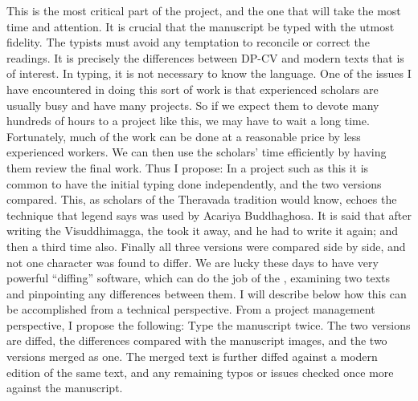\markdownRendererBlockQuoteEnd \markdownRendererInterblockSeparator
{}\markdownRendererInterblockSeparator
{}This is the most critical part of the project, and the one that will take the most time and attention. It is crucial that the manuscript be typed with the utmost fidelity. The typists must avoid any temptation to reconcile or correct the readings. It is precisely the differences between DP-CV and modern texts that is of interest.\markdownRendererInterblockSeparator
{}In typing, it is not necessary to know the language. One of the issues I have encountered in doing this sort of work is that experienced scholars are usually busy and have many projects. So if we expect them to devote many hundreds of hours to a project like this, we may have to wait a long time. Fortunately, much of the work can be done at a reasonable price by less experienced workers. We can then use the scholars’ time efficiently by having them review the final work. Thus I propose:\markdownRendererInterblockSeparator
{}\markdownRendererBlockQuoteBegin
{}
\markdownRendererBlockQuoteEnd \markdownRendererInterblockSeparator
{}In a project such as this it is common to have the initial typing done  independently, and the two versions compared. This, as scholars of the Theravada tradition would know, echoes the technique that legend says was used by Acariya Buddhaghosa. It is said that after writing the Visuddhimagga, the  took it away, and he had to write it again; and then a third time also. Finally all three versions were compared side by side, and not one character was found to differ.\markdownRendererInterblockSeparator
{}We are lucky these days to have very powerful “diffing” software, which can do the job of the , examining two texts and pinpointing any differences between them. I will describe below how this can be accomplished from a technical perspective.\markdownRendererInterblockSeparator
{}From a project management perspective, I propose the following:\markdownRendererInterblockSeparator
{}\markdownRendererOlBegin
{}Type the manuscript twice.\markdownRendererOlItemEnd 
{}The two versions are diffed, the differences compared with the manuscript images, and the two versions merged as one.\markdownRendererOlItemEnd 
{}The merged text is further diffed against a modern edition of the same text, and any remaining typos or issues checked once more against the manuscript.\markdownRendererOlItemEnd 
